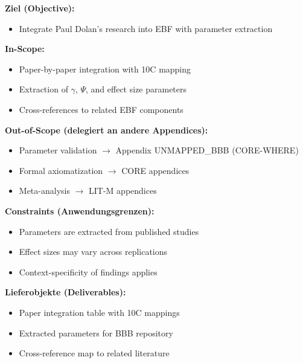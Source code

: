 
\begin{tcolorbox}[
    colback=orange!5!white,
    colframe=orange!75!black,
    title={\textbf{Appendix Scope: Ziel / In-Scope / Out-of-Scope / Constraints}},
    fonttitle=\bfseries
]

\textbf{Ziel (Objective):}
\begin{itemize}[nosep]
    \item Integrate Paul Dolan's research into EBF with parameter extraction
\end{itemize}

\textbf{In-Scope:}
\begin{itemize}[nosep]
    \item Paper-by-paper integration with 10C mapping
    \item Extraction of $\gamma$, $\Psi$, and effect size parameters
    \item Cross-references to related EBF components
\end{itemize}

\textbf{Out-of-Scope (delegiert an andere Appendices):}
\begin{itemize}[nosep]
    \item Parameter validation $\rightarrow$ Appendix UNMAPPED_BBB (CORE-WHERE)
    \item Formal axiomatization $\rightarrow$ CORE appendices
    \item Meta-analysis $\rightarrow$ LIT-M appendices
\end{itemize}

\textbf{Constraints (Anwendungsgrenzen):}
\begin{itemize}[nosep]
    \item Parameters are extracted from published studies
    \item Effect sizes may vary across replications
    \item Context-specificity of findings applies
\end{itemize}

\textbf{Lieferobjekte (Deliverables):}
\begin{itemize}[nosep]
    \item Paper integration table with 10C mappings
    \item Extracted parameters for BBB repository
    \item Cross-reference map to related literature
\end{itemize}

\end{tcolorbox}

